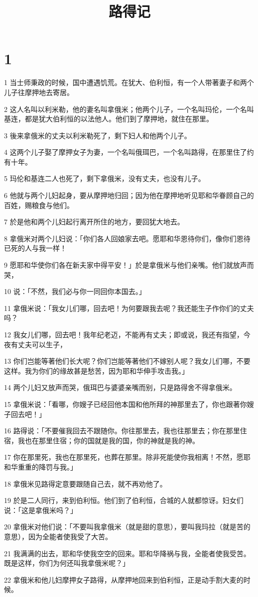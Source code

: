 

\title{路得记}


\chapter{1}

\par 1 当士师秉政的时候，国中遭遇饥荒。在犹大、伯利恒，有一个人带著妻子和两个儿子往摩押地去寄居。
\par 2 这人名叫以利米勒，他的妻名叫拿俄米；他两个儿子，一个名叫玛伦，一个名叫基连，都是犹大伯利恒的以法他人。他们到了摩押地，就住在那里。
\par 3 後来拿俄米的丈夫以利米勒死了，剩下妇人和他两个儿子。
\par 4 这两个儿子娶了摩押女子为妻，一个名叫俄珥巴，一个名叫路得，在那里住了约有十年。
\par 5 玛伦和基连二人也死了，剩下拿俄米，没有丈夫，也没有儿子。
\par 6 他就与两个儿妇起身，要从摩押地归回；因为他在摩押地听见耶和华眷顾自己的百姓，赐粮食与他们。
\par 7 於是他和两个儿妇起行离开所住的地方，要回犹大地去。
\par 8 拿俄米对两个儿妇说：「你们各人回娘家去吧。愿耶和华恩待你们，像你们恩待已死的人与我一样！
\par 9 愿耶和华使你们各在新夫家中得平安！」於是拿俄米与他们亲嘴。他们就放声而哭，
\par 10 说：「不然，我们必与你一同回你本国去。」
\par 11 拿俄米说：「我女儿们哪，回去吧！为何要跟我去呢？我还能生子作你们的丈夫吗？
\par 12 我女儿们哪，回去吧！我年纪老迈，不能再有丈夫；即或说，我还有指望，今夜有丈夫可以生子，
\par 13 你们岂能等著他们长大呢？你们岂能等著他们不嫁别人呢？我女儿们哪，不要这样。我为你们的缘故甚是愁苦，因为耶和华伸手攻击我。」
\par 14 两个儿妇又放声而哭，俄珥巴与婆婆亲嘴而别，只是路得舍不得拿俄米。
\par 15 拿俄米说：「看哪，你嫂子已经回他本国和他所拜的神那里去了，你也跟著你嫂子回去吧！」
\par 16 路得说：「不要催我回去不跟随你。你往那里去，我也往那里去；你在那里住宿，我也在那里住宿；你的国就是我的国，你的神就是我的神。
\par 17 你在那里死，我也在那里死，也葬在那里。除非死能使你我相离！不然，愿耶和华重重的降罚与我。」
\par 18 拿俄米见路得定意要跟随自己去，就不再劝他了。
\par 19 於是二人同行，来到伯利恒。他们到了伯利恒，合城的人就都惊讶。妇女们说：「这是拿俄米吗？」
\par 20 拿俄米对他们说：「不要叫我拿俄米（就是甜的意思），要叫我玛拉（就是苦的意思），因为全能者使我受了大苦。
\par 21 我满满的出去，耶和华使我空空的回来。耶和华降祸与我，全能者使我受苦。既是这样，你们为何还叫我拿俄米呢？」
\par 22 拿俄米和他儿妇摩押女子路得，从摩押地回来到伯利恒，正是动手割大麦的时候。

